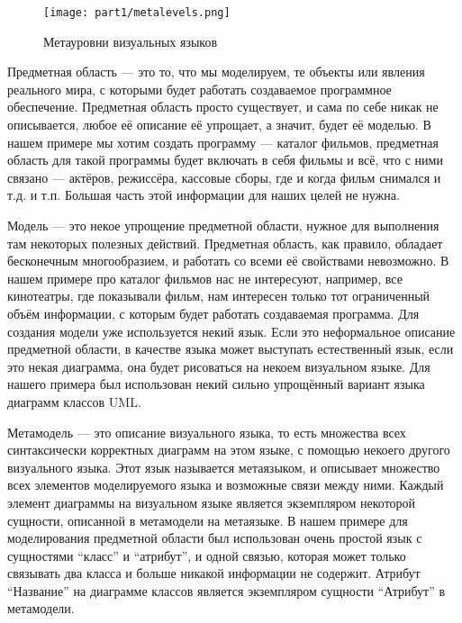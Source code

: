 \begin{figure} [ht]
	\begin{center}
		\texttt{[image: part1/metalevels.png]}
		\caption{Метауровни визуальных языков}
		\label{metalevels}
	\end{center}
\end{figure}

Предметная область --- это то, что мы моделируем, те объекты или явления 
реального мира, с которыми будет работать создаваемое программное обеспечение. 
Предметная область просто существует, и сама по себе никак не описывается, любое 
её описание её упрощает, а значит, будет её моделью. В нашем примере мы хотим 
создать программу --- каталог фильмов, предметная область для такой программы 
будет включать в себя фильмы и всё, что с ними связано --- актёров, режиссёра, 
кассовые сборы, где и когда фильм снимался и т.д. и т.п. Большая часть этой 
информации для наших целей не нужна.

Модель --- это некое упрощение предметной области, нужное для выполнения там 
некоторых полезных действий. Предметная область, как правило, обладает 
бесконечным многообразием, и работать со всеми её свойствами невозможно. 
В нашем примере про каталог фильмов нас не интересуют, например, все кинотеатры, 
где показывали фильм, нам интересен только тот ограниченный объём информации,
с которым будет работать создаваемая программа. Для создания модели уже 
используется некий язык. Если это неформальное описание предметной области, в 
качестве языка может выступать естественный язык, если это некая диаграмма, она 
будет рисоваться на некоем визуальном языке. Для нашего примера был использован 
некий сильно упрощённый вариант языка диаграмм классов UML.

Метамодель --- это описание визуального языка, то есть множества всех 
синтаксически корректных диаграмм на этом языке, с помощью некоего другого 
визуального языка. Этот язык называется метаязыком, и описывает множество всех 
элементов моделируемого языка и возможные связи между ними. Каждый элемент 
диаграммы на визуальном языке является экземпляром некоторой сущности, описанной 
в метамодели на метаязыке. В нашем примере для моделирования предметной области 
был использован очень простой язык с сущностями "`класс"' и "`атрибут"', и одной 
связью, которая может только связывать два класса и больше никакой информации 
не содержит. Атрибут "`Название"' на диаграмме классов является экземпляром 
сущности "`Атрибут"' в метамодели.


